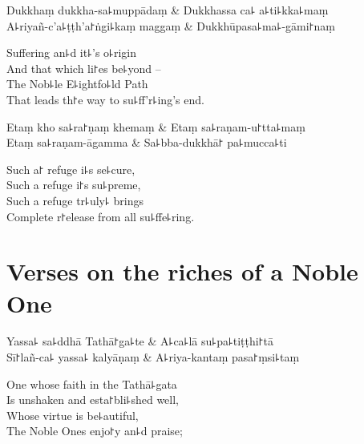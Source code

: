 \begin{twochants}
  Dukkhaṃ dukkha-sa꜕muppādaṃ & Dukkhassa ca꜕ a꜕ti꜕kka꜕maṃ \\
  A꜕riyañ-c'a꜕ṭṭh'a꜓ṅgi꜕kaṃ maggaṃ & Dukkhūpasa꜕ma꜕-gāmi꜓naṃ \\
\end{twochants}

\begin{english}
  Suffering an꜕d it꜕'s o꜕rigin\\
  And that which li꜓es be꜕yond --\\
  The Nob꜕le E꜕ightfo꜕ld Path\\
  That leads th꜓e way to su꜕ff'r꜕ing's end.
\end{english}

\begin{twochants}
  Etaṃ kho sa꜕ra꜓ṇaṃ khemaṃ & Etaṃ sa꜕raṇam-u꜓tta꜕maṃ \\
  Etaṃ sa꜕raṇam-āgamma & Sa꜕bba-dukkhā꜓ pa꜕mucca꜕ti \\
\end{twochants}

\begin{english}
  Such a꜓ refuge i꜕s se꜕cure,\\
  Such a refuge i꜓s su꜕preme,\\
  Such a refuge tr꜕uly꜕ brings\\
  Complete r꜓elease from all su꜕ffe꜕ring.
\end{english}

\chapter{Verses on the riches of a Noble One}%

\begin{leader}
\end{leader}

\begin{twochants}
  Yassa꜕ sa꜕ddhā Tathā꜓ga꜕te & A꜕ca꜕lā su꜕pa꜕tiṭṭhi꜓tā \\
  Sī꜓lañ-ca꜕ yassa꜕ kalyāṇaṃ & A꜕riya-kantaṃ pasa꜓ṃsi꜕taṃ \\
\end{twochants}

\begin{english}
  One whose faith in the Tathā꜕gata\\
  Is unshaken and esta꜓bli꜕shed well,\\
  Whose virtue is be꜕autiful,\\
  The Noble Ones enjo꜓y an꜕d praise;
\end{english}

